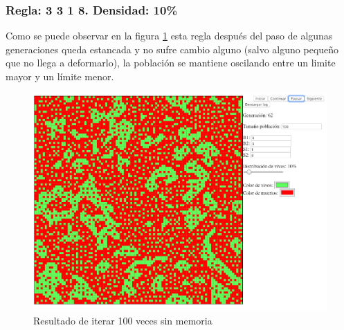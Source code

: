 	\subsubsection{Regla: 3 3 1 8. Densidad: 10\%}
	Como se puede observar en la figura \ref{fig:golm22} esta regla después del paso de algunas generaciones queda estancada y no sufre cambio alguno (salvo alguno pequeño que no llega a deformarlo), la población se mantiene oscilando entre un limite mayor y un límite menor.
	\begin{figure}[H]
		\begin{center}
			\includegraphics[scale=.3]{GOLM/img/regla3318-0.png}
			\caption{Resultado de iterar 100 veces sin memoria}
			\label{fig:golm22}
		\end{center}
	\end{figure}

